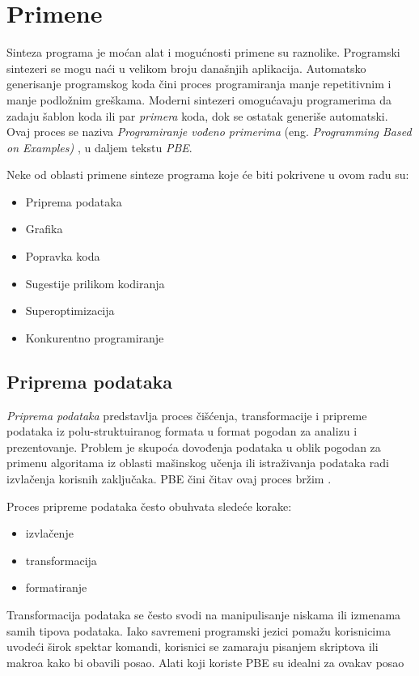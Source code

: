\section{Primene}
\label{sec:Primene}

Sinteza programa je moćan alat i mogućnosti primene su raznolike. Programski sintezeri se mogu naći u velikom broju današnjih aplikacija. Automatsko generisanje programskog koda čini proces programiranja manje repetitivnim i manje podložnim greškama. Moderni sintezeri omogućavaju programerima da zadaju šablon koda ili par \emph{primera} koda, dok se ostatak generiše automatski. Ovaj proces se naziva \emph{Programiranje vođeno primerima} (eng. \emph{Programming Based on Examples)} \cite{ProgrammingBasedOnExamples}, u daljem tekstu \emph{PBE}.

Neke od oblasti primene sinteze programa koje će biti pokrivene u ovom radu su:
\begin{itemize}
    \item Priprema podataka
    \item Grafika
    \item Popravka koda
    \item Sugestije prilikom kodiranja
    \item Superoptimizacija
    \item Konkurentno programiranje
\end{itemize}


\subsection{Priprema podataka}
\label{subsec:PripremaPodataka}

\emph{Priprema podataka} predstavlja proces čišćenja, transformacije i pripreme podataka iz polu-struktuiranog formata u format pogodan za analizu i prezentovanje. Problem je skupoća dovođenja podataka u oblik pogodan za primenu algoritama iz oblasti mašinskog učenja ili istraživanja podataka radi izvlačenja korisnih zaključaka. PBE čini čitav ovaj proces bržim \cite{ProgrammingBasedOnExamples}.

Proces pripreme podataka često obuhvata sledeće korake:
\begin{itemize}
  \item izvlačenje
  \item transformacija
  \item formatiranje
\end{itemize}

Transformacija podataka se često svodi na manipulisanje niskama ili izmenama samih tipova podataka. Iako savremeni programski jezici pomažu korisnicima uvodeći širok spektar komandi, korisnici se zamaraju pisanjem skriptova ili makroa kako bi obavili posao. Alati koji koriste PBE su idealni za ovakav posao \cite{ProgrammingBasedOnExamples, SynthesizingNumberTransformationsFromIOExamples}


